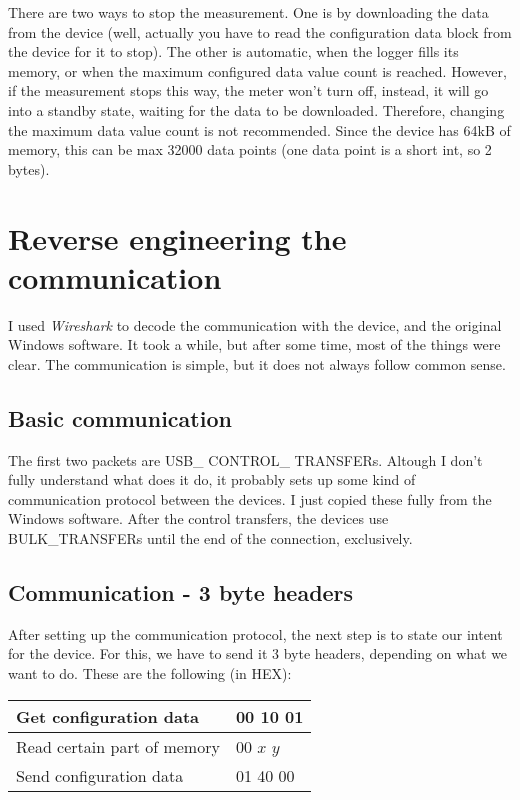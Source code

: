 \documentclass[a4paper,12pt]{article}
\begin{document}
There are two ways to stop the measurement. One is by downloading the data from the device (well, actually you have to read the configuration data block from the device for it to stop). The other is automatic, when the logger fills its memory, or when the maximum configured data value count is reached. However, if the measurement stops this way, the meter won't turn off, instead, it will go into a standby state, waiting for the data to be downloaded. Therefore, changing the maximum data value count is not recommended. Since the device has 64kB of memory, this can be max 32000 data points (one data point is a short int, so 2 bytes).

\section{Reverse engineering the communication}
I used \textit{Wireshark} to decode the communication with the device, and the original Windows software. It took a while, but after some time, most of the things were clear. The communication is simple, but it does not always follow common sense.

\subsection{Basic communication}
The first two packets are USB\_ CONTROL\_ TRANSFERs. Altough I don't fully understand what does it do, it probably sets up some kind of communication protocol between the devices. I just copied these fully from the Windows software. After the control transfers, the devices use BULK\_TRANSFERs until the end of the connection, exclusively.

\subsection{Communication - 3 byte headers}
After setting up the communication protocol, the next step is to state our intent for the device. For this, we have to send it 3 byte headers, depending on what we want to do. These are the following (in HEX):
\begin{table}[h]
\centering
\begin{tabular}{|l|l|}
\hline
Get configuration data & 00 10 01 \\ \hline
Read certain part of memory & 00 $x$ $y$ \\ \hline
Send configuration data & 01 40 00 \\ \hline
\end{tabular}
\end{table}
\end{document}
